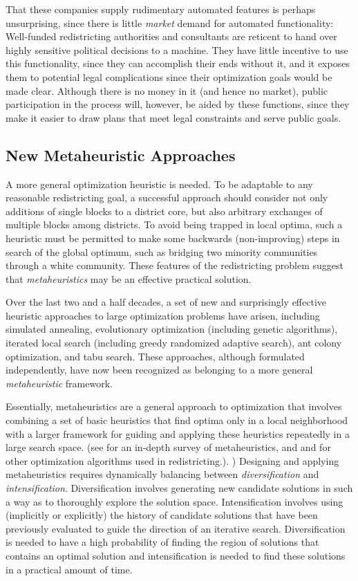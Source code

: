 \documentclass[article]{JSSstyle/jss}
\begin{document}
That these companies supply rudimentary automated features is perhaps unsurprising,  since there is little \emph{market} demand for automated functionality:  Well-funded redistricting authorities and consultants are reticent to hand over highly sensitive political decisions to a machine. They have little incentive to use this functionality, since they can accomplish their ends without it, and it exposes them to potential legal complications since their optimization goals would be made clear. Although there is no money in it (and hence no market), public participation in the process will, however, be aided by these functions, since they make it easier to draw plans that meet legal constraints and serve public goals. 


\subsection{New Metaheuristic Approaches} 

A more general optimization heuristic is needed. To be adaptable to any
reasonable redistricting goal, a successful approach should consider not only additions 
of single blocks to a district core, but also arbitrary exchanges of multiple blocks among districts.  
To avoid being trapped in local optima, such a heuristic must be permitted to make 
some backwards (non-improving) steps in search of the global optimum, such as 
bridging two minority communities through a white community. These features 
of the redistricting problem suggest that \emph{metaheuristics} may be an effective practical solution.
 
Over the last two and a half decades, a set of new and surprisingly 
effective heuristic approaches to large optimization problems have 
arisen, including simulated annealing, evolutionary optimization 
(including genetic algorithms), iterated local search (including 
greedy randomized adaptive search), ant colony optimization, and 
tabu search.  These approaches, although formulated independently, 
have now been recognized as belonging to a more general \emph{metaheuristic} framework.

Essentially, metaheuristics are a general approach to optimization that involves 
combining a set of basic heuristics that find optima only in a local neighborhood with a 
larger framework for guiding and applying these heuristics 
repeatedly in a large search space. (see \citet{BlumRoli03} for an in-depth 
survey of metaheuristics, and \citet{Altman97} \citet{CortonaEtAl99} and 
\citet{Xiao03} for other optimization algorithms used in redistricting.). )  
Designing and applying metaheuristics requires dynamically 
balancing between \emph{diversification}  and \emph{intensification}. Diversification involves generating new 
candidate solutions in such a way as to thoroughly explore the solution space. Intensification involves using (implicitly or explicitly) 
the history of candidate solutions that have been previously evaluated to guide the direction of an iterative search. 
Diversification is needed to have a high probability of finding the region of solutions that contains an optimal solution 
and intensification is needed to find these solutions in a practical amount of time. 
\end{document}
